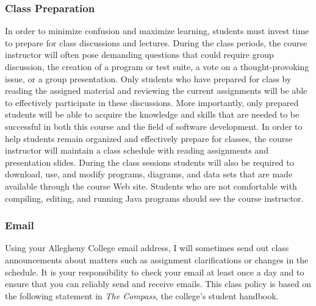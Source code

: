 \subsubsection*{Class Preparation}

%

In order to minimize confusion and maximize learning, students must invest time to prepare for class discussions and
lectures.  During the class periods, the course instructor will often pose demanding questions that could require group
discussion, the creation of a program or test suite, a vote on a thought-provoking issue, or a group presentation.
Only students who have prepared for class by reading the assigned material and reviewing the current assignments will be
able to effectively participate in these discussions.  More importantly, only prepared students will be able to acquire
the knowledge and skills that are needed to be successful in both this course and the field of software development.  In
order to help students remain organized and effectively prepare for classes, the course instructor will maintain a class
schedule with reading assignments and presentation slides.   During the class sessions students will also be required to
download, use, and modify programs, diagrams, and data sets that are made available through the course Web site.
Students who are not comfortable with compiling, editing, and running Java programs should see the course instructor.

\subsubsection*{Email}

Using your Allegheny College email address, I will sometimes send out class announcements about matters such as
assignment clarifications or changes in the schedule. It is your responsibility to check your email at least once a day
and to ensure that you can reliably send and receive emails. This class policy is based on the following statement in
{\em The Compass}, the college's student handbook.

